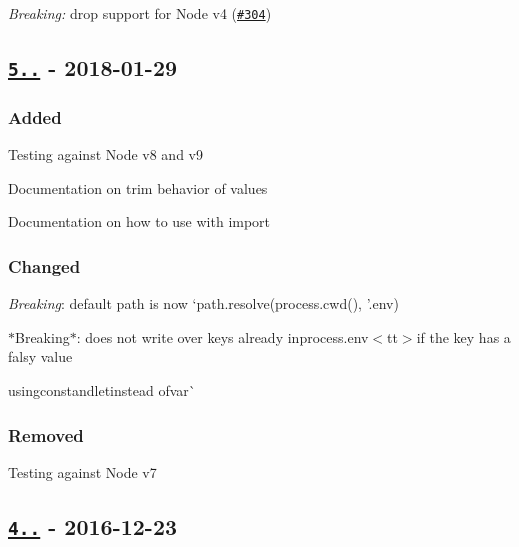 \begin{DoxyItemize}
\item {\itshape Breaking\+:} drop support for Node v4 (\href{https://github.com/motdotla/dotenv/pull/304}{\tt \#304})
\end{DoxyItemize}

\subsection*{\href{https://github.com/motdotla/dotenv/compare/v4.0.0...v5.0.0}{\tt 5..} -\/ 2018-\/01-\/29}

\subsubsection*{Added}


\begin{DoxyItemize}
\item Testing against Node v8 and v9
\item Documentation on trim behavior of values
\item Documentation on how to use with {\ttfamily import}
\end{DoxyItemize}

\subsubsection*{Changed}


\begin{DoxyItemize}
\item {\itshape Breaking}\+: default {\ttfamily path} is now `path.\+resolve(process.\+cwd(), '.env\textquotesingle{}){\ttfamily }
\item {\ttfamily $\ast$\+Breaking$\ast$\+: does not write over keys already in}process.\+env$<$tt$>$if the key has a falsy value
\item usingconst{\ttfamily and}let{\ttfamily instead of}var\`{}
\end{DoxyItemize}

\subsubsection*{Removed}


\begin{DoxyItemize}
\item Testing against Node v7
\end{DoxyItemize}

\subsection*{\href{https://github.com/motdotla/dotenv/compare/v3.0.0...v4.0.0}{\tt 4..} -\/ 2016-\/12-\/23}


